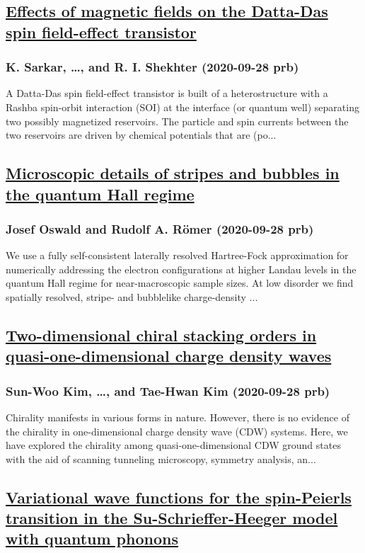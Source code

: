 \subsection*{\href{http://link.aps.org/doi/10.1103/PhysRevB.102.115436}{Effects of magnetic fields on the Datta-Das spin field-effect transistor}}
\subsubsection*{K. Sarkar, \dots, and R. I. Shekhter (2020-09-28 prb)}
A Datta-Das spin field-effect transistor is built of a heterostructure with a Rashba spin-orbit interaction (SOI) at the interface (or quantum well) separating two possibly magnetized reservoirs. The particle and spin currents between the two reservoirs are driven by chemical potentials that are (po...
\subsection*{\href{http://link.aps.org/doi/10.1103/PhysRevB.102.121305}{Microscopic details of stripes and bubbles in the quantum Hall regime}}
\subsubsection*{Josef Oswald and Rudolf A. Römer (2020-09-28 prb)}
We use a fully self-consistent laterally resolved Hartree-Fock approximation for numerically addressing the electron configurations at higher Landau levels in the quantum Hall regime for near-macroscopic sample sizes. At low disorder we find spatially resolved, stripe- and bubblelike charge-density ...
\subsection*{\href{http://link.aps.org/doi/10.1103/PhysRevB.102.121408}{Two-dimensional chiral stacking orders in quasi-one-dimensional charge density waves}}
\subsubsection*{Sun-Woo Kim, \dots, and Tae-Hwan Kim (2020-09-28 prb)}
Chirality manifests in various forms in nature. However, there is no evidence of the chirality in one-dimensional charge density wave (CDW) systems. Here, we have explored the chirality among quasi-one-dimensional CDW ground states with the aid of scanning tunneling microscopy, symmetry analysis, an...
\subsection*{\href{http://link.aps.org/doi/10.1103/PhysRevB.102.125149}{Variational wave functions for the spin-Peierls transition in the Su-Schrieffer-Heeger model with quantum phonons}}
